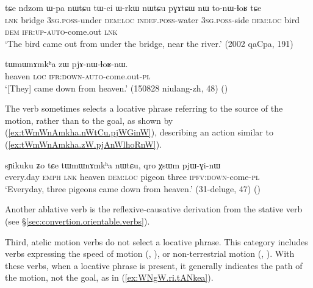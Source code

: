 \begin{exe}
\ex \label{ex:Wpa.nWtCu.tonWlhoR}
\gll  tɕe ndzom ɯ-pa nɯtɕu tɯ-ci ɯ-rkɯ nɯtɕu pɣɤtɕɯ nɯ to-nɯ-ɬoʁ tɕe \\
\textsc{lnk} bridge \textsc{3sg}.\textsc{poss}-under \textsc{dem}:\textsc{loc} \textsc{indef}.\textsc{poss}-water \textsc{3sg}.\textsc{poss}-side \textsc{dem}:\textsc{loc} bird \textsc{dem} \textsc{ifr}:\textsc{up}-\textsc{auto}-come.out \textsc{lnk} \\
\glt  `The bird came out from under the bridge, near the river.' (2002 qaCpa, 191)
\end{exe}

\begin{exe}
\ex \label{ex:tWmWnAmkha.zW.pjAnWlhoRnW}
\gll  tɯmɯnɤmkʰa zɯ pjɤ-nɯ-ɬoʁ-nɯ. \\
heaven \textsc{loc} \textsc{ifr}:\textsc{down}-\textsc{auto}-come.out-\textsc{pl} \\
\glt `[They] came down from heaven.' (150828 niulang-zh, 48) ()
\end{exe}

The verb  sometimes selects a locative phrase referring to the source of the motion, rather than to the goal, as shown by (\ref{ex:tWmWnAmkha.nWtCu.pjWGinW}), describing an action similar to (\ref{ex:tWmWnAmkha.zW.pjAnWlhoRnW}).

\begin{exe}
\ex \label{ex:tWmWnAmkha.nWtCu.pjWGinW}
\gll sɲikuku ʑo tɕe tɯmɯnɤmkʰa nɯtɕu, qro χsɯm pjɯ-ɣi-nɯ \\
every.day \textsc{emph} \textsc{lnk} heaven \textsc{dem}:\textsc{loc} pigeon three \textsc{ipfv}:\textsc{down}-come-\textsc{pl} \\
\glt `Everyday, three pigeons came down from heaven.' (31-deluge, 47)
()
\end{exe}

Another ablative verb is the reflexive-causative  derivation from the stative verb   (see §\ref{sec:convertion.orientable.verbs}).

Third, atelic motion verbs do not select a locative phrase. This category includes verbs expressing the speed of motion (, ), or non-ter\-res\-trial motion (, ). With these verbs, when a locative phrase is present, it generally indicates the path of the motion, not the goal, as in (\ref{ex:WNgW.ri.tANkea}).

